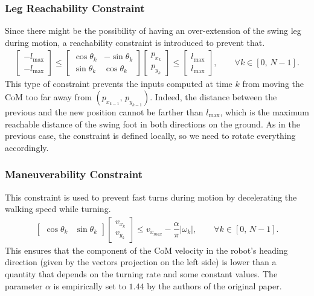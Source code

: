 \subsubsection{Leg Reachability Constraint}
Since there might be the possibility of having an over-extension of the swing leg during motion, a reachability constraint is introduced to prevent that.
\begin{align}
    \begin{bmatrix}
        -l_{\max} \\[1ex]
        -l_{\max}
    \end{bmatrix}
    \le
    \begin{bmatrix}
        \cos\theta_{k} & -\sin\theta_{k} \\[1ex]
        \sin\theta_{k} & \cos\theta_{k}
    \end{bmatrix}
    \begin{bmatrix}
        p_{x_{k}} \\[1ex]
        p_{y_{k}}
    \end{bmatrix}
    \le
    \begin{bmatrix}
        l_{\max} \\[1ex]
        l_{\max}
    \end{bmatrix}
    , \qquad \forall k \in \left[ 0,\, N-1\right].
\end{align}
This type of constraint prevents the inputs computed at time $k$ from moving the CoM too far away from $(p_{x_{k-1}},\,p_{y_{k-1}})$. Indeed, the distance between the previous and the new position cannot be farther than $l_{\max}$, which is the maximum reachable distance of the swing foot in both directions on the ground. As in the previous case, the constraint is defined locally, so we need to rotate everything accordingly.

\subsubsection{Maneuverability Constraint}
This constraint is used to prevent fast turns during motion by decelerating the walking speed while turning.
\begin{align}
    \begin{bmatrix}
        \cos\theta_{k} & \sin\theta_{k}
    \end{bmatrix}
    \begin{bmatrix}
        v_{x_{k}} \\[1ex]
        v_{y_{k}}
    \end{bmatrix}
    \le
    v_{x_{max}} - \dfrac{\alpha}{\pi}|\omega_{k}|
    , \qquad \forall k \in \left[ 0,\, N-1\right].
\end{align}
This ensures that the component of the CoM velocity in the robot's heading direction (given by the vectors projection on the left side) is lower than a quantity that depends on the turning rate and some constant values. The parameter $\alpha$ is empirically set to $1.44$ by the authors of the original paper.

